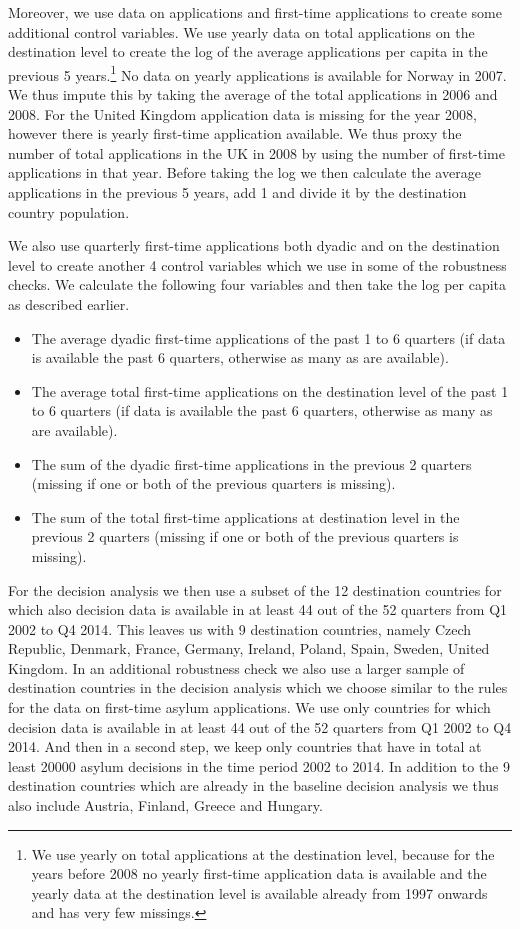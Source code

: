 \documentclass[11pt,a4paper]{scrartcl}
\begin{document}
Moreover, we use data on applications and first-time applications to create some additional control variables. We use yearly data on total applications on the destination level to create the log of the average applications per capita in the previous 5 years.\footnote{We use yearly on total applications at the destination level, because for the years before 2008 no yearly first-time application data is available and the yearly data at the destination level is available already from 1997 onwards and has very few missings.} No data on yearly applications is available for Norway in 2007. We thus impute this by taking the average of the total applications in 2006 and 2008. For the United Kingdom application data is missing for the year 2008, however there is yearly first-time application available. We thus proxy the number of total applications in the UK in 2008 by using the number of first-time applications in that year. Before taking the log we then calculate the average applications in the previous 5 years, add 1 and divide it by the destination country population. 

We also use quarterly first-time applications both dyadic and on the destination level to create another 4 control variables which we use in some of the robustness checks. We calculate the following four variables and then take the log per capita as described earlier. 
\begin{itemize}
	\item The average dyadic first-time applications of the past 1 to 6 quarters (if data is available the past 6 quarters, otherwise as many as are available).
	\item  The average total first-time applications on the destination level of the past 1 to 6 quarters (if data is available the past 6 quarters, otherwise as many as are available).
	\item The sum of the dyadic first-time applications in the previous 2 quarters (missing if one or both of the previous quarters is missing).
	\item The sum of the total first-time applications at destination level in the previous 2 quarters (missing if one or both of the previous quarters is missing).
\end{itemize}


For the decision analysis we then use a subset of the 12 destination countries for which also decision data is available in at least 44 out of the 52 quarters from Q1 2002 to Q4 2014. This leaves us with 9 destination countries, namely Czech Republic, Denmark, France, Germany, Ireland, Poland, Spain, Sweden, United Kingdom. In an additional robustness check we also use a larger sample of destination countries in the decision analysis which we choose similar to the rules for the data on first-time asylum applications. We use only countries for which decision data is available in at least 44 out of the 52 quarters from Q1 2002 to Q4 2014. And then in a second step, we keep only countries that have in total at least 20000 asylum decisions in the time period 2002 to 2014. In addition to the 9 destination countries which are already in the baseline decision analysis we thus also include Austria, Finland, Greece and Hungary. 
\end{document}

